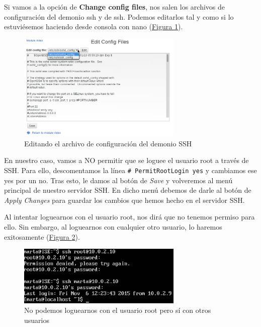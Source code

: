 \documentclass[10pt,a4paper,spanish]{article}
\numberwithin{equation}{section} %
\numberwithin{figure}{section} %
\numberwithin{table}{section} %
\begin{document}
Si vamos a la opción de \textbf{Change config files}, nos salen los archivos de configuración del demonio ssh y de ssh. Podemos editarlos tal y como si lo estuviésemos haciendo desde consola con nano (\hyperref[sshconfigedit]{Figura \ref*{sshconfigedit}}).

\begin{figure}[!h]
    \centering
    \includegraphics[width=0.7\textwidth]{32}
    \caption{Editando el archivo de configuración del demonio SSH}
    \label{sshconfigedit}
\end{figure}

En nuestro caso, vamos a NO permitir que se loguee el usuario root a través de SSH. Para ello, descomentamos la línea \texttt{\# PermitRootLogin yes} y cambiamos ese yes por un no. Tras esto, le damos al botón de \textit{Save} y volveremos al menú principal de nuestro servidor SSH. En dicho menú debemos de darle al botón de \textit{Apply Changes} para guardar los cambios que hemos hecho en el servidor SSH.

Al intentar loguearnos con el usuario root, nos dirá que no tenemos permiso para ello. Sin embargo, al loguearnos con cualquier otro usuario, lo haremos exitosamente (\hyperref[sshloginroot]{Figura \ref*{sshloginroot}}).

\begin{figure}[!h]
    \centering
    \includegraphics[width=0.7\textwidth]{33}
    \caption{No podemos loguearnos con el usuario root pero sí con otros usuarios}
    \label{sshloginroot}
\end{figure}
\end{document}
